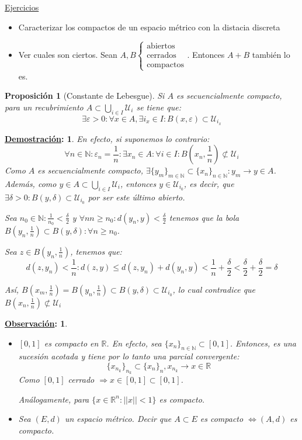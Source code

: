 \documentclass[10pt,a4paper,openright]{book}
\theoremstyle{break}
\newtheorem*{prop}{Proposición}
\newtheorem*{demo}{\underline{Demostración}:}
\newtheorem*{obs}{\underline{Observación}:}
\begin{document}
\underline{Ejercicios}
\begin{itemize}
\item Caracterizar los compactos de un espacio métrico con la distacia discreta

\item Ver cuales son ciertos. Sean $A, B \begin{cases} \mbox{abiertos} \\ \mbox{cerrados} \\ \mbox{compactos} \end{cases}$. Entonces $A + B$ también lo es.
\end{itemize}

\begin{prop}[Constante de Lebesgue]
Si $A$ es secuencialmente compacto, para un recubrimiento $A \subset \bigcup_{i \in I} \mathcal{U}_i$ se tiene que:
$$\exists \varepsilon > 0 : \forall x \in A, \exists i_x \in I : B(x, \varepsilon) \subset \mathcal{U}_{i_x}$$
\end{prop}

\begin{demo}
En efecto, si suponemos lo contrario:
$$\forall n \in \mathbb{N} : \varepsilon_n = \frac{1}{n}: \exists x_n \in A : \forall i \in I: B\left(x_n, \frac{1}{n}\right) \not\subset \mathcal{U}_i$$
Como $A$ es secuencialmente compacto, $\exists \{y_m\}_{m \in \mathbb{N}} \subset \{ x_n\}_{n \in \mathbb{N}} : y_m \to y \in A$. Además, como $y \in A \subset \bigcup_{i \in I} \mathcal{U}_i$, entonces $y \in \mathcal{U}_{i_0}$, es decir, que $\exists \delta > 0 : B(y, \delta) \subset \mathcal{U}_{i_0}$ por ser este último abierto.

Sea $n_0 \in \mathbb{N} : \frac{1}{n_0} < \frac{\delta}{2}$ y $\forall nn \geq n_0: d(y_n, y)< \frac{\delta}{2}$ tenemos que la bola $B(y_n, \frac{1}{n}) \subset B(y,\delta) : \forall n\geq n_0$.

Sea $z \in B(y_n, \frac{1}{n})$, tenemos que:
$$d(z, y_n) < \frac{1}{n} : d(z,y) \leq d(z,y_n)+ d(y_n,y) < \frac{1}{n} + \frac{\delta}{2} < \frac{\delta}{2} + \frac{\delta}{2} = \delta$$

Así, $B(x_m, \frac{1}{n})=B(y_n,\frac{1}{n})\subset B(y,\delta) \subset \mathcal{U}_{i_0}$, lo cual contradice que $B(x_n, \frac{1}{n}) \not\subset \mathcal{U}_i$
\end{demo}

\begin{obs}
\begin{itemize}
\item $[0,1]$ es compacto en $\mathbb{R}$. En efecto, sea $\{x_n\}_{n \in \mathbb{N}} \subset [0,1]$. Entonces, es una sucesión acotada y tiene por lo tanto una parcial convergente: $$\{x_{n_k}\}_{n_k} \subset \{x_n\}_n, x_{n_k} \to x \in \mathbb{R}$$
Como $[0,1]$ cerrado $\Rightarrow x \in [0,1] \subset [0,1]$.

Análogamente, para $\{x \in \mathbb{R}^n : ||x|| < 1\}$ es compacto.

\item Sea $(E,d)$ un espacio métrico. Decir que $A \subset E$ es compacto $\Leftrightarrow (A,d)$ es compacto.
\end{itemize}
\end{obs}
\end{document}
